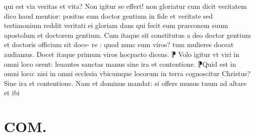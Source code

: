 \documentclass{article}
\begin{document}
\begin{pages}
qui est via veritas et vita? Non igitur se effert! non gloriatur cum dicit veritatem dico haud mentior: positus sum doctor gentium in fide et veritate  sed testimonium reddit veritati ei gloriam dans qui fecit eum praeconem suum  apostolum  et doctorem gentium. Cum itaque  sit constitutus a deo doctor gentium et doctoris officium sit doce- re : quod  nunc eum viros? tum mulieres doceat audiamus. Docet itaque  primum viros hocpacto    dicens. ⁋ Volo igitur vt viri in omni loco orent: leuantes sanctas manus sine ira et contentione. ⁋Quid est in omni loco: nisi in omni ecclesia vbicumque  locorum in terra cognoscitur Christus? Sine ira et contentionc. Nam et dominus mandat: si offers munus tuum ad altare et ibi  \pend
\section*{COM. }

\end{pages}
\end{document}
